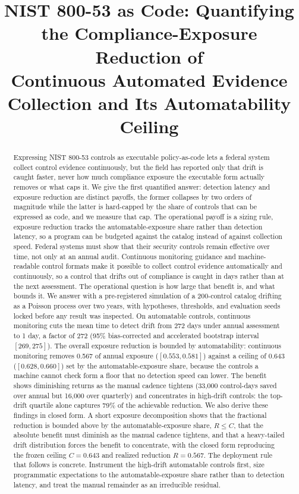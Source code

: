 \documentclass[journal]{IEEEtran}
\title{NIST 800-53 as Code: Quantifying the Compliance-Exposure Reduction of\\
Continuous Automated Evidence Collection and Its Automatability Ceiling}
\author{%
  \IEEEauthorblockN{Harshavardhan Malla}
  \IEEEauthorblockA{Independent Researcher\\
  Email: harshavardhanmalla75@gmail.com}%
}
\begin{document}
\maketitle

\begin{abstract}
Expressing NIST 800-53 controls as executable policy-as-code lets a federal system collect control
evidence continuously, but the field has reported only that drift is caught faster, never how much
compliance exposure the executable form actually removes or what caps it. We give the first
quantified answer: detection latency and exposure reduction are distinct payoffs, the former
collapses by two orders of magnitude while the latter is hard-capped by the share of controls that
can be expressed as code, and we measure that cap. The operational payoff is a sizing rule, exposure
reduction tracks the automatable-exposure share rather than detection latency, so a program can be
budgeted against the catalog instead of against collection speed. Federal systems must show that
their security controls remain effective over time, not only at an
annual audit. Continuous monitoring guidance and machine-readable control formats make it possible
to collect control evidence automatically and continuously, so a control that drifts out of
compliance is caught in days rather than at the next assessment. The operational question is how
large that benefit is, and what bounds it. We answer with a pre-registered simulation of a
200-control catalog drifting as a Poisson process over two years, with hypotheses, thresholds, and
evaluation seeds locked before any result was inspected. On automatable controls, continuous
monitoring cuts the mean time to detect drift from 272 days under annual assessment to 1 day, a
factor of 272 (95\% bias-corrected and accelerated bootstrap interval $[269, 275]$). The overall
exposure reduction is bounded by automatability: continuous monitoring removes 0.567 of annual
exposure ($[0.553, 0.581]$) against a ceiling of 0.643 ($[0.628, 0.660]$) set by the
automatable-exposure share, because the controls a machine cannot check form a floor that no
detection speed can lower. The benefit shows diminishing returns as the manual cadence tightens
(33{,}000 control-days saved over annual but 16{,}000 over quarterly) and concentrates in
high-drift controls: the top-drift quartile alone captures 79\% of the achievable reduction.
We also derive these findings in closed form. A short exposure decomposition shows that the
fractional reduction is bounded above by the automatable-exposure share, $R \le C$, that the absolute
benefit must diminish as the manual cadence tightens, and that a heavy-tailed drift distribution
forces the benefit to concentrate, with the closed form reproducing the frozen ceiling $C = 0.643$
and realized reduction $R = 0.567$. The deployment rule that follows is concrete. Instrument the
high-drift automatable controls first, size programmatic expectations to the automatable-exposure
share rather than to detection latency, and treat the manual remainder as an irreducible residual.
\end{abstract}
\end{document}
